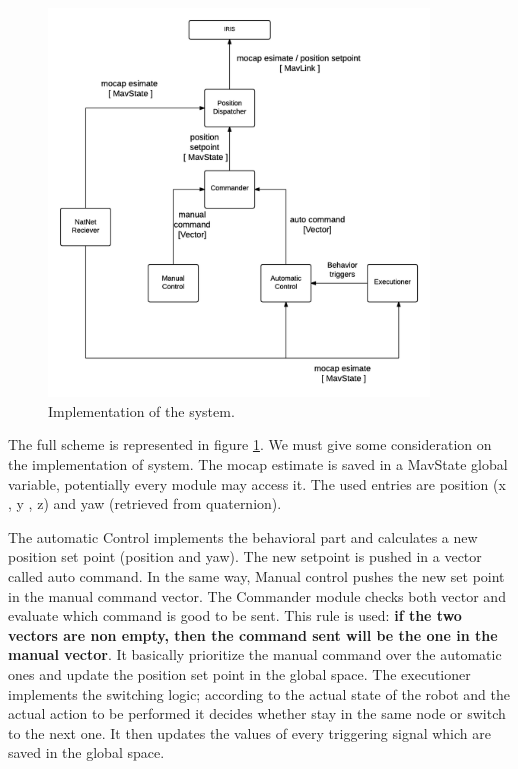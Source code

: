 \begin{figure}[h]
\centering
 \includegraphics[width=0.9\textwidth]{arch_scheme.png}
 \caption[Achtitecture scheme]{Implementation of the system.}
 \label{figure:archscheme}
\end{figure}
The full scheme is represented in figure \ref{figure:archscheme}. We must give some consideration on the implementation of system. The mocap estimate is saved in a MavState global variable, potentially every module may access it. The used entries are position (x , y , z) and yaw (retrieved from quaternion).

The automatic Control implements the behavioral part and calculates a new position set point (position and yaw). The new setpoint is pushed in a vector called auto command. In the same way, Manual control pushes the new set point in the manual command vector. The Commander module checks both vector and evaluate which command is good to be sent. This rule is used: \textbf{if the two vectors are non empty, then the command sent will be the one in the manual vector}. It basically prioritize the manual command over the automatic ones and update the position set point in the global space. The executioner implements the switching logic; according to the actual state of the robot and the actual action to be performed it decides whether stay in the same node or switch to the next one. It then updates the values of every triggering signal which are saved in the global space.

